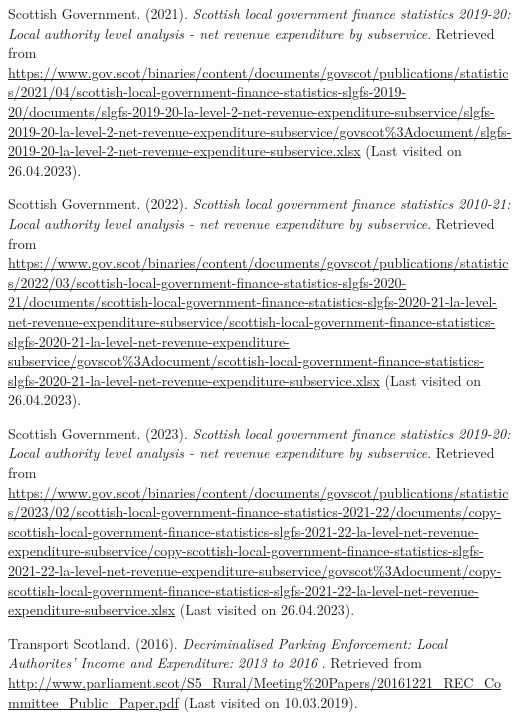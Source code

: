\documentclass[
  12pt,
]{article}
\newlength{\cslhangindent}
\newlength{\cslentryspacingunit} %
\newenvironment{CSLReferences}[2] %
 {%
  \setlength{\parindent}{0pt}
  \ifodd #1
  \let\oldpar\par
  \def\par{\hangindent=\cslhangindent\oldpar}
  \fi
  \setlength{\parskip}{#2\cslentryspacingunit}
 }%
 {}
\begin{document}
\begin{CSLReferences}{1}{0}
\leavevmode{}%
Scottish Government. (2021). \emph{Scottish local government finance statistics 2019-20: Local authority level analysis - net revenue expenditure by subservice}. Retrieved from \url{https://www.gov.scot/binaries/content/documents/govscot/publications/statistics/2021/04/scottish-local-government-finance-statistics-slgfs-2019-20/documents/slgfs-2019-20-la-level-2-net-revenue-expenditure-subservice/slgfs-2019-20-la-level-2-net-revenue-expenditure-subservice/govscot\%3Adocument/slgfs-2019-20-la-level-2-net-revenue-expenditure-subservice.xlsx} (Last visited on 26.04.2023).

\leavevmode{}%
Scottish Government. (2022). \emph{Scottish local government finance statistics 2010-21: Local authority level analysis - net revenue expenditure by subservice}. Retrieved from \url{https://www.gov.scot/binaries/content/documents/govscot/publications/statistics/2022/03/scottish-local-government-finance-statistics-slgfs-2020-21/documents/scottish-local-government-finance-statistics-slgfs-2020-21-la-level-net-revenue-expenditure-subservice/scottish-local-government-finance-statistics-slgfs-2020-21-la-level-net-revenue-expenditure-subservice/govscot\%3Adocument/scottish-local-government-finance-statistics-slgfs-2020-21-la-level-net-revenue-expenditure-subservice.xlsx} (Last visited on 26.04.2023).

\leavevmode{}%
Scottish Government. (2023). \emph{Scottish local government finance statistics 2019-20: Local authority level analysis - net revenue expenditure by subservice}. Retrieved from \url{https://www.gov.scot/binaries/content/documents/govscot/publications/statistics/2023/02/scottish-local-government-finance-statistics-2021-22/documents/copy-scottish-local-government-finance-statistics-slgfs-2021-22-la-level-net-revenue-expenditure-subservice/copy-scottish-local-government-finance-statistics-slgfs-2021-22-la-level-net-revenue-expenditure-subservice/govscot\%3Adocument/copy-scottish-local-government-finance-statistics-slgfs-2021-22-la-level-net-revenue-expenditure-subservice.xlsx} (Last visited on 26.04.2023).

\leavevmode{}%
Transport Scotland. (2016). \emph{{Decriminalised Parking Enforcement: Local Authorites' Income and Expenditure: 2013 to 2016 }}. Retrieved from \url{http://www.parliament.scot/S5_Rural/Meeting\%20Papers/20161221_REC_Committee_Public_Paper.pdf} (Last visited on 10.03.2019).


\end{CSLReferences}
\end{document}
